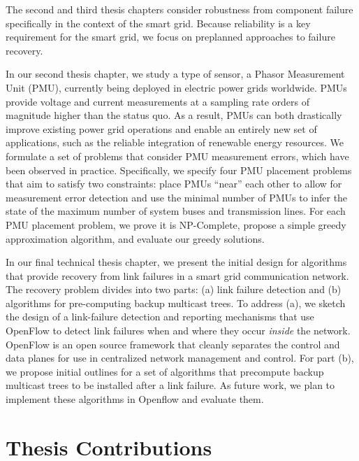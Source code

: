 The second and third thesis chapters consider robustness from component failure specifically in the context of the smart grid. Because reliability is a key requirement for the smart grid, we focus on 
preplanned approaches to failure recovery.

In our second thesis chapter, we study a type of sensor, a Phasor Measurement Unit (PMU), currently being deployed in electric power grids worldwide. 
PMUs provide voltage and current measurements at a sampling rate orders of magnitude higher than the status quo.  As a result, PMUs can 
both drastically improve existing power grid operations and enable an entirely new set of applications, such as the reliable integration of renewable energy resources. 
We formulate a set of problems that consider PMU measurement errors, which have been observed in practice.  Specifically, we specify four PMU placement problems
that aim to satisfy two constraints: place PMUs ``near'' each other to allow for measurement error detection and use the minimal number of PMUs to infer the state of the maximum number of system buses and transmission lines. 
For each PMU placement problem, we prove it is NP-Complete, propose a simple greedy approximation algorithm, and evaluate our greedy solutions.

In our final technical thesis chapter, we present the initial design for algorithms that provide recovery from link failures in a smart grid communication network.  
The recovery problem divides into two parts: (a) link failure detection and (b) algorithms for pre-computing backup multicast trees.  
To address (a), we sketch the design of a link-failure detection and reporting mechanisms that use OpenFlow to detect link failures when and where they occur \emph{inside} the network.
OpenFlow is an open source framework that cleanly separates the control and data planes for use in centralized network management and control.
For part (b), we propose initial outlines for a set of algorithms that precompute backup multicast trees to be installed after a link failure.
As future work, we plan to implement these algorithms in Openflow and evaluate them.






\section{Thesis Contributions}


